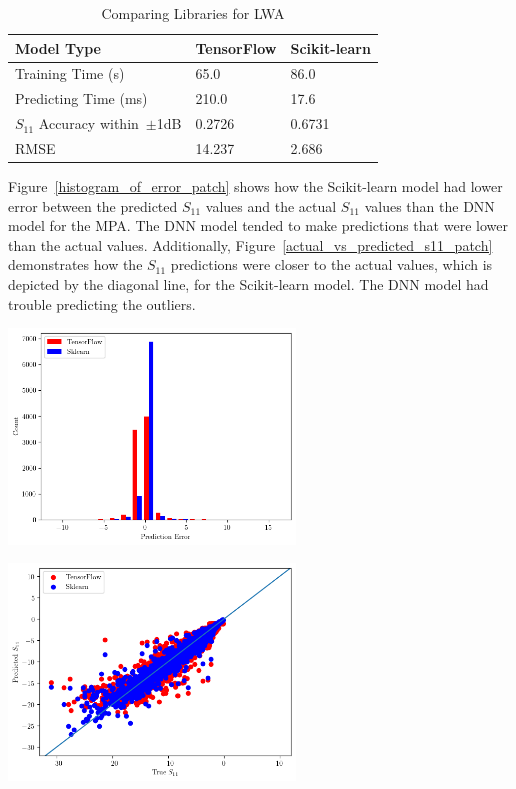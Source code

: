 \documentclass[conference]{IEEEtran}
\newenvironment{Figure}
    {\par\medskip\noindent\minipage{\linewidth}}
    {\endminipage\par\medskip}
\begin{document}
\begin{table}[h]
\caption{Comparing Libraries for LWA}
\begin{center}
\begin{tabular}{ |l|l|l| }
    \hline
    Model Type & TensorFlow & Scikit-learn \\ 
    \hline
    Training Time (s) & 65.0 & 86.0 \\  
    \hline
    Predicting Time (ms) & 210.0 & 17.6 \\
    \hline
    $S_{11}$ Accuracy within~$\pm$1dB & 0.2726 & 0.6731 \\
    \hline
    RMSE & 14.237 & 2.686 \\
    \hline
\end{tabular}
\end{center}
\label{comparing_libraries_lw}
\end{table}

Figure~\ref{histogram_of_error_patch} shows how the Scikit-learn model had lower error between the predicted $S_{11}$ values and the actual $S_{11}$ values than the DNN model for the MPA. The DNN model tended to make predictions that were lower than the actual values. Additionally, Figure~\ref{actual_vs_predicted_s11_patch} demonstrates how the $S_{11}$ predictions were closer to the actual values, which is depicted by the diagonal line, for the Scikit-learn model. The DNN model had trouble predicting the outliers. 

\begin{Figure}
    \centering
    \includegraphics[width=3in]{histogram_patch}
    \label{histogram_of_error_patch}
\end{Figure}

\begin{Figure}
    \centering
    \includegraphics[width=3in]{actual_vs_predicted_s11_patch}
    \label{actual_vs_predicted_s11_patch}
\end{Figure}
\end{document}
